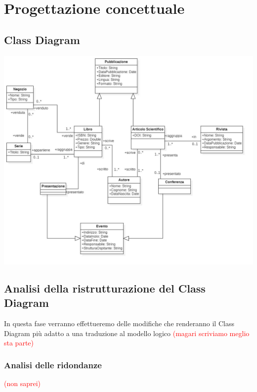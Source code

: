 \chapter{Progettazione concettuale}
    \section{Class Diagram}

    \includegraphics[scale=0.3]{Immagini/UML_v1_0.png}
        
    \section{Analisi della ristrutturazione del Class Diagram}
        In questa fase verranno effettueremo delle modifiche che renderanno il Class Diagram
        più adatto a una traduzione al modello logico \textcolor{red}{(magari scriviamo meglio sta parte)}
        \subsection{Analisi delle ridondanze}
        \textcolor{red}{(non saprei)}

